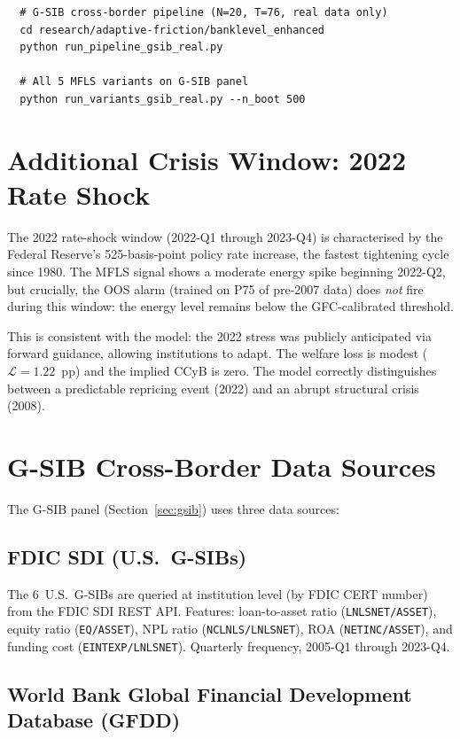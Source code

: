 \documentclass[11pt]{article}
\theoremstyle{definition}
\begin{document}
\begin{appendices}
\begin{verbatim}
  # G-SIB cross-border pipeline (N=20, T=76, real data only)
  cd research/adaptive-friction/banklevel_enhanced
  python run_pipeline_gsib_real.py

  # All 5 MFLS variants on G-SIB panel
  python run_variants_gsib_real.py --n_boot 500
\end{verbatim}

\section{Additional Crisis Window: 2022 Rate Shock}
\label{app:2022}

The 2022 rate-shock window (2022-Q1 through 2023-Q4) is characterised by
the Federal Reserve's 525-basis-point policy rate increase, the fastest
tightening cycle since 1980.  The MFLS signal shows a moderate energy spike
beginning 2022-Q2, but crucially, the OOS alarm (trained on P75 of
pre-2007 data) does \emph{not} fire during this window: the energy level
remains below the GFC-calibrated threshold.

This is consistent with the model: the 2022 stress was publicly anticipated
via forward guidance, allowing institutions to adapt.  The welfare loss is
modest ($\mathcal{L} = 1.22$~pp) and the implied CCyB is zero.  The model
correctly distinguishes between a predictable repricing event (2022)
and an abrupt structural crisis (2008).

\section{G-SIB Cross-Border Data Sources}
\label{app:gsib_data}

The G-SIB panel (Section~\ref{sec:gsib}) uses three data sources:

\subsection{FDIC SDI (U.S.\ G-SIBs)}

The 6~U.S.\ G-SIBs are queried at institution level (by FDIC CERT number)
from the FDIC SDI REST API.  Features: loan-to-asset ratio
(\texttt{LNLSNET/ASSET}), equity ratio (\texttt{EQ/ASSET}), NPL ratio
(\texttt{NCLNLS/LNLSNET}), ROA (\texttt{NETINC/ASSET}), and funding cost
(\texttt{EINTEXP/LNLSNET}).  Quarterly frequency, 2005-Q1 through 2023-Q4.

\subsection{World Bank Global Financial Development Database (GFDD)}


\end{appendices}
\end{document}
